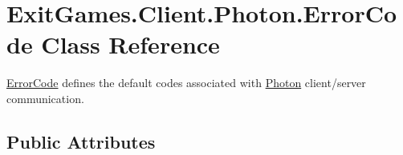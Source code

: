 \hypertarget{class_exit_games_1_1_client_1_1_photon_1_1_error_code}{}\section{Exit\+Games.\+Client.\+Photon.\+Error\+Code Class Reference}
\label{class_exit_games_1_1_client_1_1_photon_1_1_error_code}


\hyperlink{class_exit_games_1_1_client_1_1_photon_1_1_error_code}{Error\+Code} defines the default codes associated with \hyperlink{namespace_exit_games_1_1_client_1_1_photon}{Photon} client/server communication.  


\subsection*{Public Attributes}
